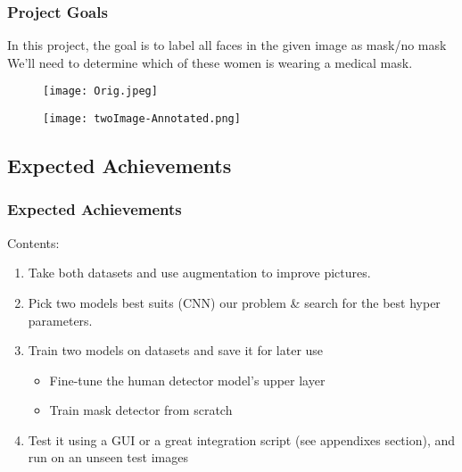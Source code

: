 \begin{frame}
    \frametitle{Project Goals}
    In this project, the goal is to label all faces in the given image as mask/no mask
    We'll need to determine which of these women is wearing a \alert{medical mask}.
    \begin{figure}[]
        \texttt{[image: Orig.jpeg]}
        \label{fig:Orig}
    \end{figure}

    \begin{figure}
        \texttt{[image: twoImage-Annotated.png]}
        \label{fig:Annotated}
    \end{figure}
\end{frame}

\subsection{Expected Achievements}
\begin{frame}
    \frametitle{Expected Achievements}
    Contents:
    \begin{enumerate}
      \item<1-> Take both datasets and use augmentation to improve pictures.
      \item<2-> Pick two models best suits (CNN) our problem \& search for the best hyper parameters.
      \item<3-> Train two models on datasets and save it for later use
      \begin{itemize}
          \item Fine-tune the human detector model's upper layer
          \item Train mask detector from scratch
      \end{itemize}
      \item<4-> Test it using a GUI or a great integration script (see appendixes section), and run on an unseen test images
    \end{enumerate}
\end{frame}

